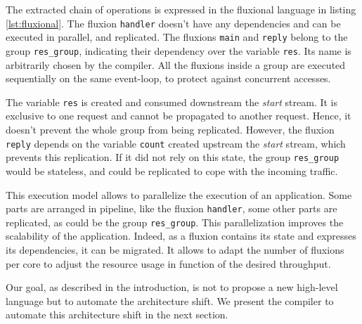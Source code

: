 The extracted chain of operations is expressed in the fluxional language in listing \ref{lst:fluxional}.
The fluxion \texttt{handler} doesn't have any dependencies and can be executed in parallel, and replicated.
The fluxions \texttt{main} and \texttt{reply} belong to the group \texttt{res\_group}, indicating their dependency over the variable \texttt{res}.
Its name is arbitrarily chosen by the compiler.
All the fluxions inside a group are executed sequentially on the same event-loop, to protect against concurrent accesses.

The variable \texttt{res} is created and consumed downstream the \textit{start} stream.
It is exclusive to one request and cannot be propagated to another request.
Hence, it doesn't prevent the whole group from being replicated.
However, the fluxion \texttt{reply} depends on the variable \texttt{count} created upstream the \textit{start} stream, which prevents this replication.
If it did not rely on this state, the group \texttt{res\_group} would be stateless, and could be replicated to cope with the incoming traffic.

This execution model allows to parallelize the execution of an application.
Some parts are arranged in pipeline, like the fluxion \texttt{handler}, some other parts are replicated, as could be the group \texttt{res\_group}.
This parallelization improves the scalability of the application.
Indeed, as a fluxion contains its state and expresses its dependencies, it can be migrated.
It allows to adapt the number of fluxions per core to adjust the resource usage in function of the desired throughput.

Our goal, as described in the introduction, is not to propose a new high-level language but to automate the architecture shift.
We present the compiler to automate this architecture shift in the next section.

